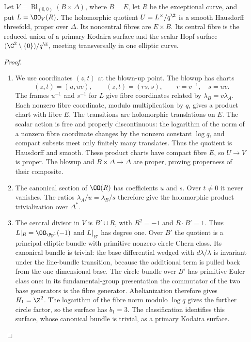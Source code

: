 \begin{proposition}\hypertarget{tag-02WG}{}\label{night:P4.1}\label{stmt:P4.1}

Let $V=\operatorname{Bl}_{(0,0)}(B\times\Delta)$, where $B=E$, let $R$ be
the exceptional curve, and put $L=\OO_V(R)$. The holomorphic quotient
$U=L^\times/q^\Z$ is a smooth Hausdorff threefold, proper over $\Delta$.
Its noncentral fibres are $E\times B$. Its central fibre is the reduced
union of a primary Kodaira surface and the scalar Hopf surface
$(\C^2\setminus\{0\})/q^\Z$, meeting transversally in one elliptic curve.
\end{proposition}
\begin{proof}

\begin{enumerate}[label={$\langle1\rangle$\arabic*.},leftmargin=*]
\item We use coordinates $(z,t)$ at the blown-up point. The blowup has charts
\[
 (z,t)=(u,uv),\qquad (z,t)=(rs,s),\qquad r=v^{-1},\quad s=uv.
\]
The frames $u^{-1}$ and $s^{-1}$ for $L$ give fibre coordinates related by
$\lambda_B=v\lambda_A$. Each nonzero fibre coordinate, modulo multiplication
by $q$, gives a product chart with fibre $E$. The transitions are holomorphic
translations on $E$. The scalar action is free and properly discontinuous:
the logarithm of the norm of a nonzero fibre coordinate changes by the
nonzero constant $\log q$, and compact subsets meet only finitely many
translates. Thus the quotient is Hausdorff and smooth. These product charts
have compact fibre $E$, so $U\to V$ is proper. The blowup and $B\times\Delta
\to\Delta$ are proper, proving properness of their composite.

\item The canonical section of $\OO(R)$ has coefficients $u$ and $s$. Over
$t\ne0$ it never vanishes. The ratios $\lambda_A/u=\lambda_B/s$ therefore
give the holomorphic product trivialization over $\Delta^*$.

\item The central divisor in $V$ is $B'\cup R$, with $R^2=-1$ and $R\cdot B'=1$.
Thus $L|_R=\OO_{\Pp^1}(-1)$ and $L|_{B'}$ has degree one. Over $B'$ the
quotient is a principal elliptic bundle with primitive nonzero circle Chern
class. Its canonical bundle is trivial: the base differential wedged with
$d\lambda/\lambda$ is invariant under the line-bundle transition, because
the additional term is pulled back from the one-dimensional base. The
circle bundle over $B'$ has primitive Euler class one: in its
fundamental-group presentation the commutator of the two base generators
is the fibre generator. Abelianization therefore gives $H_1=\Z^2$.
The logarithm of the fibre norm modulo $\log q$ gives the further
circle factor, so the surface has $b_1=3$. The classification
\cite[Chapter~VI, Theorem~1.1 and Table~10, pp.~243--244]{BHPV2004E}
identifies this surface, whose canonical bundle is trivial, as a primary
Kodaira surface.


\end{enumerate}
\end{proof}
